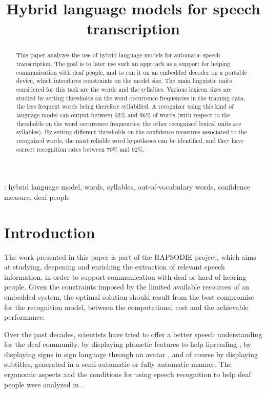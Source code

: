 \documentclass[a4paper]{article}
\title{Hybrid language models for speech transcription}
\begin{document}
\maketitle


\begin{abstract}
This paper analyzes the use of hybrid language models for automatic speech transcription. The goal is to later use such an approach as a support for helping communication with deaf people, and to run it on an embedded decoder on a portable device, which introduces constraints on the model size. The main linguistic units considered for this task are the words and the syllables. Various lexicon sizes are studied by setting thresholds on the word occurrence frequencies in the training data, the less frequent words being therefore syllabified. A recognizer using this kind of language model can output between 62\% and 96\% of words (with respect to the thresholds on the word occurrence frequencies; the other recognized lexical units are syllables). By setting different thresholds on the confidence measures associated to the recognized words, the most reliable word hypotheses can be identified, and they have correct recognition rates between 70\% and 92\%.
\end{abstract}
: hybrid language model, words, syllables, out-of-vocabulary words, confidence measure, deaf people


\section{Introduction}

The work presented in this paper is part of the RAPSODIE project, which aims at studying, deepening and enriching the extraction of relevant speech information, in order to support communication with deaf or hard of hearing people.
Given the constraints imposed by the limited available resources of an embedded system, the optimal solution should result from the best compromise for the recognition model, between the computational cost and the achievable performance.

Over the past decades, scientists have tried to offer a better speech understanding for the deaf community, by displaying phonetic features to help lipreading \cite{Sokol1996}, by displaying signs in sign language through an avatar \cite{Cox2002}, and of course by displaying subtitles, generated in a semi-automatic or fully automatic manner. The ergonomic aspects and the conditions for using speech recognition to help deaf people were analyzed in \cite{Woodcock1997}.
\end{document}
